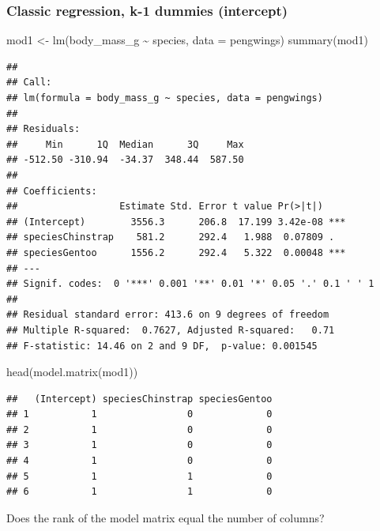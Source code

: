\documentclass[
  openany]{book}
\newenvironment{Shaded}{\begin{snugshade}}{\end{snugshade}}
\newcommand{\AttributeTok}[1]{\textcolor[rgb]{0.77,0.63,0.00}{#1}}
\newcommand{\FunctionTok}[1]{\textcolor[rgb]{0.00,0.00,0.00}{#1}}
\newcommand{\NormalTok}[1]{#1}
\newcommand{\OtherTok}[1]{\textcolor[rgb]{0.56,0.35,0.01}{#1}}
\newcommand{\SpecialCharTok}[1]{\textcolor[rgb]{0.00,0.00,0.00}{#1}}
\begin{document}
\hypertarget{classic-regression-k-1-dummies-intercept}{%
\subsubsection{Classic regression, k-1 dummies (intercept)}\label{classic-regression-k-1-dummies-intercept}}

\begin{Shaded}
\begin{Highlighting}[]
\NormalTok{mod1 }\OtherTok{\textless{}{-}} \FunctionTok{lm}\NormalTok{(body\_mass\_g }\SpecialCharTok{\textasciitilde{}}\NormalTok{ species, }\AttributeTok{data =}\NormalTok{ pengwings)}
\FunctionTok{summary}\NormalTok{(mod1)}
\end{Highlighting}
\end{Shaded}

\begin{verbatim}
## 
## Call:
## lm(formula = body_mass_g ~ species, data = pengwings)
## 
## Residuals:
##     Min      1Q  Median      3Q     Max 
## -512.50 -310.94  -34.37  348.44  587.50 
## 
## Coefficients:
##                  Estimate Std. Error t value Pr(>|t|)    
## (Intercept)        3556.3      206.8  17.199 3.42e-08 ***
## speciesChinstrap    581.2      292.4   1.988  0.07809 .  
## speciesGentoo      1556.2      292.4   5.322  0.00048 ***
## ---
## Signif. codes:  0 '***' 0.001 '**' 0.01 '*' 0.05 '.' 0.1 ' ' 1
## 
## Residual standard error: 413.6 on 9 degrees of freedom
## Multiple R-squared:  0.7627, Adjusted R-squared:   0.71 
## F-statistic: 14.46 on 2 and 9 DF,  p-value: 0.001545
\end{verbatim}

\begin{Shaded}
\begin{Highlighting}[]
\FunctionTok{head}\NormalTok{(}\FunctionTok{model.matrix}\NormalTok{(mod1))}
\end{Highlighting}
\end{Shaded}

\begin{verbatim}
##   (Intercept) speciesChinstrap speciesGentoo
## 1           1                0             0
## 2           1                0             0
## 3           1                0             0
## 4           1                0             0
## 5           1                1             0
## 6           1                1             0
\end{verbatim}

Does the rank of the model matrix equal the number of columns?
\end{document}
